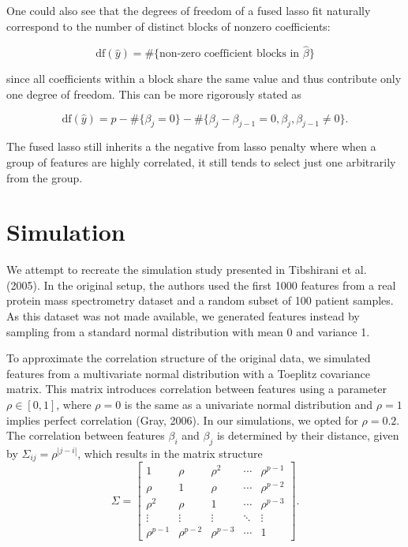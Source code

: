 \documentclass[12pt]{article}
\begin{document}
 One could also see that the degrees of freedom of a fused lasso fit naturally correspond to the number of distinct blocks of nonzero coefficients:

\[\text{df}(\hat{y}) = \#\{\text{non-zero coefficient blocks in }\hat{\beta}\}\]

\noindent since all coefficients within a block share the same value and thus contribute only one degree of freedom. This can be more rigorously stated as 

\[\text{df}(\hat{y}) = p - \#\{\beta_j = 0\} - \#\{\beta_j - \beta_{j - 1} = 0, \beta_j, \beta_{j - 1} \ne 0\}.\]

\noindent The fused lasso still inherits a the negative from lasso penalty where when a group of features are highly correlated, it still tends to select just one arbitrarily from the group.

\section{Simulation}

We attempt to recreate the simulation study presented in Tibshirani et al. (2005). In the original setup, the authors used the first 1000 features from a real protein mass spectrometry dataset and a random subset of 100 patient samples. As this dataset was not made available, we generated features instead by sampling from a standard normal distribution with mean 0 and variance 1. 

To approximate the correlation structure of the original data, we simulated features from a multivariate normal distribution with a Toeplitz covariance matrix. This matrix introduces correlation between features using a parameter \(\rho \in [0, 1]\), where \(\rho = 0\) is the same as a univariate normal distribution and \(\rho = 1\) implies perfect correlation (Gray, 2006). In our simulations, we opted for $\rho = 0.2$. The correlation between features $\beta_i$ and $\beta_j$ is determined by their distance, given by $\Sigma_{ij} = \rho^{|j-i|}$, which results in the matrix structure
\[
\Sigma = 
\begin{bmatrix}
1 & \rho & \rho^2 & \cdots & \rho^{p-1} \\
\rho & 1 & \rho & \cdots & \rho^{p-2} \\
\rho^2 & \rho & 1 & \cdots & \rho^{p-3} \\
\vdots & \vdots & \vdots & \ddots & \vdots \\
\rho^{p-1} & \rho^{p-2} & \rho^{p-3} & \cdots & 1
\end{bmatrix}.
\]
\end{document}
